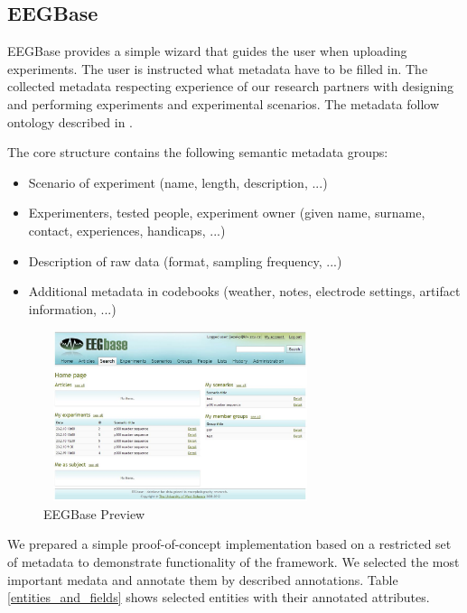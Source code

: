\documentclass[conference]{IEEEtran}
\begin{document}
\subsection{EEGBase} \label{Portal}



EEGBase provides a simple wizard that guides the user when uploading experiments. The user is instructed what metadata have to be filled in. The collected metadata respecting experience of our research partners with designing and performing experiments and experimental scenarios. The metadata follow ontology described in \cite{BMEI_jezek_moucek}.

The core structure contains the following semantic metadata groups:

\begin{itemize}
\item Scenario of experiment (name, length, description, ...)
\item Experimenters, tested people, experiment owner (given name, surname, contact, experiences, handicaps, ...)
\item Description of raw data (format, sampling frequency, ...)
\item Additional metadata in codebooks (weather, notes, electrode settings, artifact information, ...)
\end{itemize}


\begin{figure}
\centering\includegraphics[width=8cm, height=5cm]{portal_preview}
\caption{\label{portal}EEGBase Preview}

\end{figure}

We prepared a simple proof-of-concept implementation based on a restricted set of metadata to demonstrate functionality of the framework. We selected the most important medata and annotate them by described annotations. Table \ref{entities_and_fields} shows selected entities with their annotated attributes.
\end{document}
